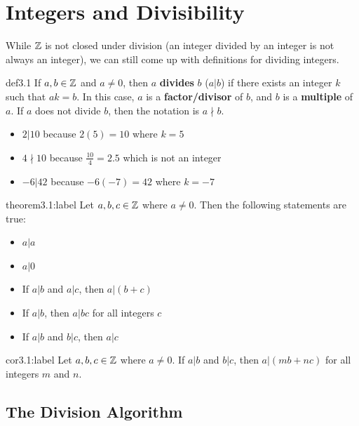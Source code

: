 \section{Integers and Divisibility}

While $\mathbb{Z}$ is not closed under division (an integer divided by an integer is not always an integer), we can still come up with definitions for dividing integers. 

\begin{definition}{def3.1}
    If $a,b\in\mathbb{Z}$ and $a\ne 0$, then $a$ \textbf{divides} $b$ ($a|b$) if there exists an integer $k$ such that $ak = b$. In this case, $a$ is a \textbf{factor/divisor} of $b$, and $b$ is a \textbf{multiple} of $a$. If $a$ does not divide $b$, then the notation is $a \nmid b$.
\end{definition}

\begin{itemize}
    \item $2|10$ because $2(5)=10$ where $k=5$
    \item $4 \nmid 10$ because $\frac{10}{4} = 2.5$ which is not an integer
    \item $-6|42$ because $-6(-7)=42$ where $k=-7$
\end{itemize}


\begin{theorem}{theorem3.1:label}
    Let $a,b,c \in \mathbb{Z}$ where $a \ne 0$. Then the following statements are true:

    \begin{itemize}
        \item $a|a$
        \item $a|0$
        \item If $a|b$ and $a|c$, then $a|(b+c)$
        \item If $a|b$, then $a|bc$ for all integers $c$
        \item If $a|b$ and $b|c$, then $a|c$
    \end{itemize}
\end{theorem}

\begin{corollary}{cor3.1:label}
    Let $a,b,c\in \mathbb{Z}$ where $a\ne 0$. If $a|b$ and $b|c$, then $a | (mb + nc)$ for all integers $m$ and $n$.
\end{corollary}

\subsection{The Division Algorithm}

